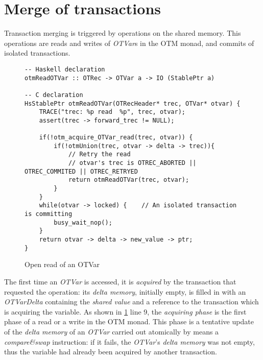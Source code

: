 \section{Merge of transactions}

Transaction merging is triggered by operations on the shared memory.
This operations are reads and writes of \emph{OTVar}s in the OTM monad, and commits of isolated transactions.

\begin{figure}
\begin{lstlisting}
-- Haskell declaration
otmReadOTVar :: OTRec -> OTVar a -> IO (StablePtr a)

-- C declaration
HsStablePtr otmReadOTVar(OTRecHeader* trec, OTVar* otvar) {
    TRACE("trec: %p read  %p", trec, otvar);
    assert(trec -> forward_trec != NULL);

    if(!otm_acquire_OTVar_read(trec, otvar)) {
        if(!otmUnion(trec, otvar -> delta -> trec)){
            // Retry the read
            // otvar's trec is OTREC_ABORTED || OTREC_COMMITED || OTREC_RETRYED
            return otmReadOTVar(trec, otvar);
        }
    }
    while(otvar -> locked) {    // An isolated transaction is committing
        busy_wait_nop();
    }
    return otvar -> delta -> new_value -> ptr;
}
\end{lstlisting}
\caption{Open read of an OTVar}
\label{fig:otmread}
\vspace{-5pt}
\end{figure}

The first time an \emph{OTVar} is accessed, it is \emph{acquired} by the transaction that requested the operation: its \emph{delta memory}, initially empty, is filled in with an \emph{OTVarDelta} containing the \emph{shared value} and a reference to the transaction which is acquiring the variable.
As shown in \cref{fig:otmread} line 9, the \emph{acquiring phase} is the first phase of a read or a write in the OTM monad.
This phase is a tentative update of the \emph{delta memory} of an \emph{OTVar} carried out atomically by means a \emph{compare\&swap} instruction: if it fails, the \emph{OTVar}'s \emph{delta memory} was not empty, thus the variable had already been acquired by another transaction.

